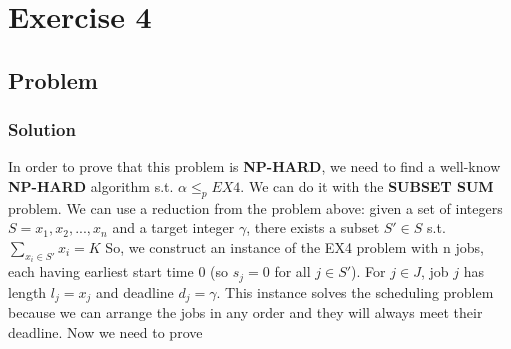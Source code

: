 \documentclass[11pt]{article}
\begin{document}
\section*{Exercise 4}
\subsection*{Problem}

\subsubsection*{Solution}
In order to prove that this problem is \textbf{NP-HARD}, we need to find a well-know \textbf{NP-HARD} algorithm s.t. $\alpha \le_p EX4$. We can do it with the \textbf{SUBSET SUM} problem. We can use a reduction from the problem above: given a set of integers $S = {x_1, x_2, ..., x_n}$ and a target integer $\gamma$, there exists a subset $S' \in S$ s.t. $\sum\limits_{x_i \in S'}x_i = K$
So, we construct an instance of the EX4 problem with n jobs, each having earliest start time $0$ (so $s_j = 0$ for all $j \in S'$). For $j \in J$, job $j$ has length $l_j = x_j$ and deadline $d_j = \gamma$. This instance solves the scheduling problem because we can arrange the jobs in any order and they will always meet their deadline. Now we need to prove
\end{document}
